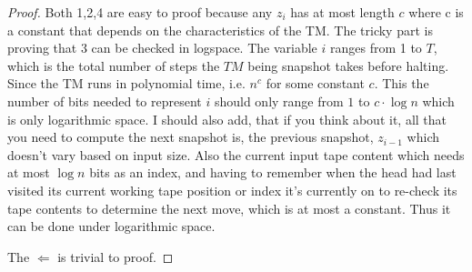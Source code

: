 \documentclass[12pt, a4paper]{article}
\begin{document}
\begin{proof}
  Both 1,2,4 are easy to proof because any $z_i$ has at most length $c$ where c is a constant that depends on the characteristics of the TM. The tricky part is proving that 3 can be checked in logspace. The variable $i$ ranges from 1 to $T$, which is the total number of steps the $TM$ being snapshot takes before halting. Since the TM runs in polynomial time, i.e. $n^c$ for some constant $c$. This the number of bits needed to represent $i$ should only range from $1$ to $c \cdot \log n$ which is only logarithmic space. I should also add, that if you think about it, all that you need to compute the next snapshot is, the previous snapshot, $z_{i-1}$ which doesn't vary based on input size. Also the current input tape content which needs at most $\log n$ bits as an index, and having to remember when the head had last visited its current working tape position or index it's currently on to re-check its tape contents to determine the next move, which is at most a constant. Thus it can be done under logarithmic space.


  The $\Longleftarrow$ is trivial to proof.


\end{proof}
\end{document}
